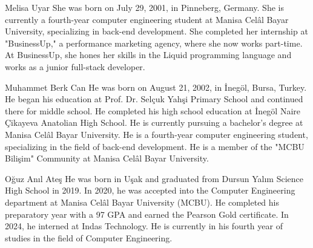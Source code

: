 \documentclass[twoside,a4paper,journal]{IEEEtran}
\begin{document}
\begin{IEEEbiography}{Melisa Uyar}
She was born on July 29, 2001, in Pinneberg, Germany.
She is currently a fourth-year computer engineering student at Manisa Celâl
Bayar University, specializing in back-end development.
She completed her internship at "BusinessUp," a performance marketing agency,
where she now works part-time.
At BusinessUp, she hones her skills in the Liquid programming language and
works as a junior full-stack developer.
\end{IEEEbiography}

\begin{IEEEbiography}{Muhammet Berk Can}
He was born on August 21, 2002, in İnegöl, Bursa, Turkey.
He began his education at Prof. Dr. Selçuk Yahşi Primary School and continued
there for middle school.
He completed his high school education at İnegöl Naire Çikayeva Anatolian High
School.
He is currently pursuing a bachelor's degree at Manisa Celâl Bayar University.
He is a fourth-year computer engineering student, specializing in the field of
back-end development.
He is a member of the "MCBU Bilişim" Community at Manisa Celâl Bayar University.
\end{IEEEbiography}

\begin{IEEEbiography}{Oğuz Anıl Ateş}
He was born in Uşak and graduated from Dursun Yalım Science High School in 2019.
In 2020, he was accepted into the Computer Engineering department at Manisa
Celâl Bayar University (MCBU).
He completed his preparatory year with a 97 GPA and earned the Pearson Gold
certificate.
In 2024, he interned at Indas Technology.
He is currently in his fourth year of studies in the field of Computer
Engineering.
\end{IEEEbiography}
\end{document}
